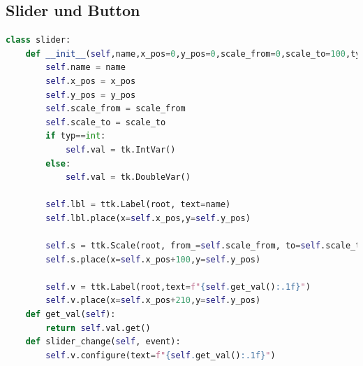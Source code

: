 \documentclass{article}
\begin{document}
\subsection{Slider und Button}
\begin{lstlisting}[language=Python]
class slider:    
	def __init__(self,name,x_pos=0,y_pos=0,scale_from=0,scale_to=100,typ=int):
		self.name = name
		self.x_pos = x_pos
		self.y_pos = y_pos
		self.scale_from = scale_from
		self.scale_to = scale_to
		if typ==int: 
			self.val = tk.IntVar() 
		else: 
			self.val = tk.DoubleVar() 

		self.lbl = ttk.Label(root, text=name)
		self.lbl.place(x=self.x_pos,y=self.y_pos)

		self.s = ttk.Scale(root, from_=self.scale_from, to=self.scale_to, 	orient="horizontal",command=self.slider_change,variable=self.val)
		self.s.place(x=self.x_pos+100,y=self.y_pos)

		self.v = ttk.Label(root,text=f"{self.get_val():.1f}")
		self.v.place(x=self.x_pos+210,y=self.y_pos)
	def get_val(self):
		return self.val.get()
	def slider_change(self, event):
		self.v.configure(text=f"{self.get_val():.1f}")
\end{lstlisting}

\end{document}
